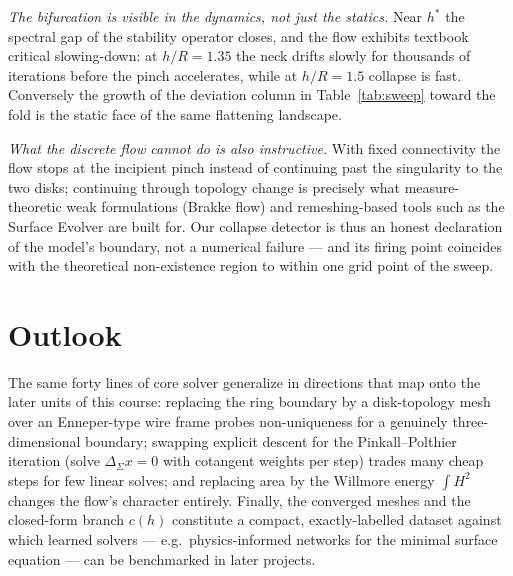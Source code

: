 \documentclass[11pt,a4paper]{article}
\begin{document}
\emph{The bifurcation is visible in the dynamics, not just the statics.}
Near $h^{*}$ the spectral gap of the stability operator closes, and the flow
exhibits textbook critical slowing-down: at $h/R=1.35$ the neck drifts slowly
for thousands of iterations before the pinch accelerates, while at $h/R=1.5$
collapse is fast. Conversely the growth of the deviation column in
Table~\ref{tab:sweep} toward the fold is the static face of the same
flattening landscape.

\emph{What the discrete flow cannot do is also instructive.} With fixed
connectivity the flow stops at the incipient pinch instead of continuing past
the singularity to the two disks; continuing through topology change is
precisely what measure-theoretic weak formulations (Brakke flow) and
remeshing-based tools such as the Surface Evolver \cite{brakke} are built for.
Our collapse detector is thus an honest declaration of the model's boundary,
not a numerical failure --- and its firing point coincides with the
theoretical non-existence region to within one grid point of the sweep.

\section{Outlook}

The same forty lines of core solver generalize in directions that map onto the
later units of this course: replacing the ring boundary by a disk-topology mesh
over an Enneper-type wire frame probes non-uniqueness for a genuinely
three-dimensional boundary; swapping explicit descent for the
Pinkall--Polthier iteration \cite{pinkall} (solve $\Delta_\Sigma x=0$ with
cotangent weights per step) trades many cheap steps for few linear solves; and
replacing area by the Willmore energy $\int H^{2}$ changes the flow's character
entirely. Finally, the converged meshes and the closed-form branch $c(h)$
constitute a compact, exactly-labelled dataset against which learned solvers
--- e.g.\ physics-informed networks for the minimal surface equation --- can be
benchmarked in later projects.
\end{document}

